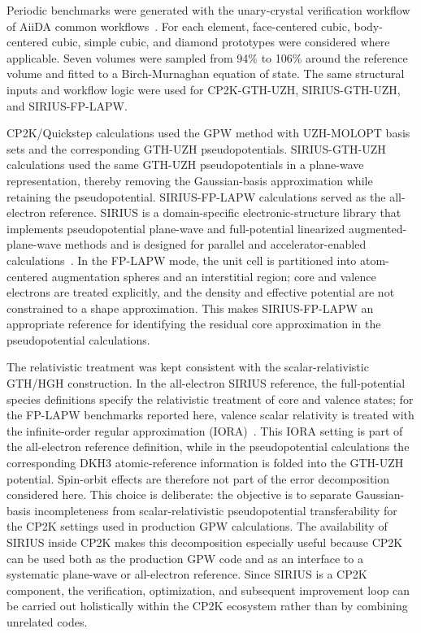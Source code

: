 \documentclass[aps,prb,reprint,amsmath,amssymb,superscriptaddress,longbibliography,floatfix]{revtex4-2}
\begin{document}
Periodic benchmarks were generated with the unary-crystal verification workflow of AiiDA common workflows~\cite{Huber2021,Bosoni2024}. For each element, face-centered cubic, body-centered cubic, simple cubic, and diamond prototypes were considered where applicable. Seven volumes were sampled from 94\% to 106\% around the reference volume and fitted to a Birch-Murnaghan equation of state. The same structural inputs and workflow logic were used for CP2K-GTH-UZH, SIRIUS-GTH-UZH, and SIRIUS-FP-LAPW.

CP2K/Quickstep calculations used the GPW method with UZH-MOLOPT basis sets and the corresponding GTH-UZH pseudopotentials. SIRIUS-GTH-UZH calculations used the same GTH-UZH pseudopotentials in a plane-wave representation, thereby removing the Gaussian-basis approximation while retaining the pseudopotential. SIRIUS-FP-LAPW calculations served as the all-electron reference. SIRIUS is a domain-specific electronic-structure library that implements pseudopotential plane-wave and full-potential linearized augmented-plane-wave methods and is designed for parallel and accelerator-enabled calculations~\cite{Zhang2022Computation,Zhang2023Sirius,SiriusDocs}. In the FP-LAPW mode, the unit cell is partitioned into atom-centered augmentation spheres and an interstitial region; core and valence electrons are treated explicitly, and the density and effective potential are not constrained to a shape approximation. This makes SIRIUS-FP-LAPW an appropriate reference for identifying the residual core approximation in the pseudopotential calculations.

The relativistic treatment was kept consistent with the scalar-relativistic GTH/HGH construction. In the all-electron SIRIUS reference, the full-potential species definitions specify the relativistic treatment of core and valence states; for the FP-LAPW benchmarks reported here, valence scalar relativity is treated with the infinite-order regular approximation (IORA)~\cite{Dyall1999IORA}. This IORA setting is part of the all-electron reference definition, while in the pseudopotential calculations the corresponding DKH3 atomic-reference information is folded into the GTH-UZH potential. Spin-orbit effects are therefore not part of the error decomposition considered here. This choice is deliberate: the objective is to separate Gaussian-basis incompleteness from scalar-relativistic pseudopotential transferability for the CP2K settings used in production GPW calculations. The availability of SIRIUS inside CP2K makes this decomposition especially useful because CP2K can be used both as the production GPW code and as an interface to a systematic plane-wave or all-electron reference. Since SIRIUS is a CP2K component, the verification, optimization, and subsequent improvement loop can be carried out holistically within the CP2K ecosystem rather than by combining unrelated codes.
\end{document}
